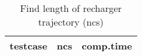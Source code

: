 \documentclass{article}
\begin{document}
\begin{table}[h!]
  \begin{center}
    \caption{Find length of recharger trajectory (ncs)}
    \label{tab:table1}
    \begin{tabular}{l|c|r}
      \textbf{testcase} & \textbf{ncs} & \textbf{comp.time}\\
      \hline
    \end{tabular}
  \end{center}
\end{table}
\end{document}
